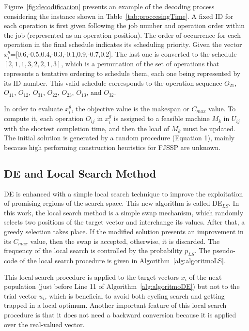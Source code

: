 Figure~\ref{fig:decodificacion} presents an example of the decoding process considering the instance shown in Table~\ref{tab:proccesingTime}. A fixed ID for each operation is first given following the job number and operation order within the job (represented as an operation position). The order of occurrence for each operation in the final schedule indicates its scheduling priority. Given the vector $x_i^g$=[0.6,-0.5,0.4,-0.3,-0.1,0.9,-0.7,0.2]. The last one is converted to the schedule $[2, 1, 1, 3, 2, 2, 1, 3]$, which is a permutation of the set of operations that represents a tentative ordering to schedule them, each one being represented by its ID number. This valid schedule corresponds to the operation sequence $O_{21}$, $O_{11}$, $O_{12}$, $O_{31}$, $O_{22}$, $O_{23}$, $O_{13}$, and $O_{32}$. 

In order to evaluate $x_i^g$, the objective value is the makespan or $C_{max}$ value. To compute it, each operation $O_{ij}$ in $x_i^g$ is assigned to a feasible machine $M_k$ in $U_{ij}$ with the shortest completion time, and then the load of $M_k$ must be updated. The initial solution is generated by a random procedure (Equation 1), mainly because high performing construction heuristics for FJSSP are unknown.

\subsection{DE and Local Search Method} \label{subsec:HDE}

DE is enhanced with a simple local search technique to improve the exploitation of promising regions of the search space. This new algorithm is called DE$_{LS}$. In this work, the local search method is a simple swap mechanism, which randomly selects two positions of the target vector and interchange its values. After that, a greedy selection takes place. If the modified solution presents an improvement in its $C_{max}$ value, then the swap is accepted, otherwise, it is discarded. The frequency of the local search is controlled by the probability $p_{LS}$. The pseudo-code of the local search procedure is given in Algorithm~\ref{alg:algoritmoLS}. 

This local search procedure is applied to the target vectors $x_{i}$ of the next population (just before Line 11 of Algorithm~\ref{alg:algoritmoDE}) but not to the trial vector $u_{i}$, which is beneficial to avoid both cycling search and getting trapped in a local optimum.  Another important feature of this local search procedure is that it does not need a backward conversion because it is applied over the real-valued vector.


